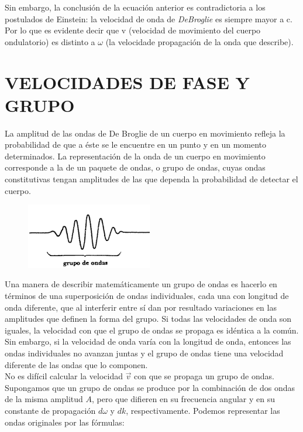 \documentclass[a4paper]{article}
\begin{document}
    \indent Sin embargo, la conclusión de la ecuación anterior es contradictoria a los postulados de Einstein: la velocidad de onda de \textit{DeBroglie} es siempre mayor a c. Por lo que es evidente decir que v (velocidad de movimiento del cuerpo ondulatorio) es distinto a $\omega$ (la velocidade propagación de la onda que describe). \\

\newpage
\noindent
\thispagestyle{fancy}

\section{VELOCIDADES DE FASE Y GRUPO}
    \indent La amplitud de las ondas de De Broglie de un cuerpo en movimiento refleja la probabilidad de que a éste se le encuentre en un punto y en un momento determinados. La representación de la onda de un cuerpo en movimiento corresponde a la de un paquete de ondas, o grupo de ondas, cuyas ondas constitutivas tengan amplitudes de las que dependa la probabilidad de detectar el cuerpo.\\

    \begin{figure}[h!]
        \centering
        \includegraphics[width = 5.5cm]{../grupoDeOndas.png}
    \end{figure}

    \indent Una manera de describir matemáticamente un grupo de ondas es hacerlo en términos de una superposición de ondas individuales, cada una con longitud de onda diferente, que al interferir entre sí dan por resultado variaciones en las amplitudes que definen la forma del grupo. Si todas las velocidades de onda son iguales, la velocidad con que el grupo de ondas se propaga es idéntica a la común. Sin embargo, si la velocidad de onda varía con la longitud de onda, entonces las ondas individuales no avanzan juntas y el grupo de ondas tiene una velocidad diferente de las ondas que lo componen.\\

    \indent No es difícil calcular la velocidad $\vec{v}$ con que se propaga un grupo de ondas. Supongamos que un grupo de ondas se produce por la combinación de dos ondas de la misma amplitud $A$, pero que difieren en su frecuencia angular y en su constante de propagación $d\omega$  y $dk$, respectivamente. Podemos representar las ondas originales por las fórmulas:
\end{document}
